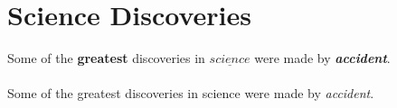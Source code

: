 \documentclass{article}
\begin{document}
	\section{Science Discoveries}
	Some of the \textbf{greatest}
	discoveries in $\underline{science}$
	were made by
	\textbf{\textit{accident}}.
	
	\paragraph{}
	Some of the greatest discoveries in science were made by \emph{accident}.
	
\end{document}
